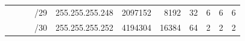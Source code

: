 \documentclass[11pt,a4paper]{article}
\begin{document}
\begin{table}[p!]
\begin{tabular}{ccccl|r|r|r|r|r|r|}
\multicolumn{1}{|c|}{}                                 & \multicolumn{1}{c|}{}                                  & \multicolumn{1}{c|}{}                                  & \multicolumn{1}{c|}{/29} & 255.255.255.248              & 2097152                      & 8192                         & 32                           & 6                            & 6                            & 6                            \\ \cline{4-11} 
\multicolumn{1}{|c|}{}                                 & \multicolumn{1}{c|}{}                                  & \multicolumn{1}{c|}{}                                  & \multicolumn{1}{c|}{/30} & 255.255.255.252              & 4194304                      & 16384                        & 64                           & 2                            & 2                            & 2                            \\ \hline
\end{tabular}
\end{table}
\end{document}

